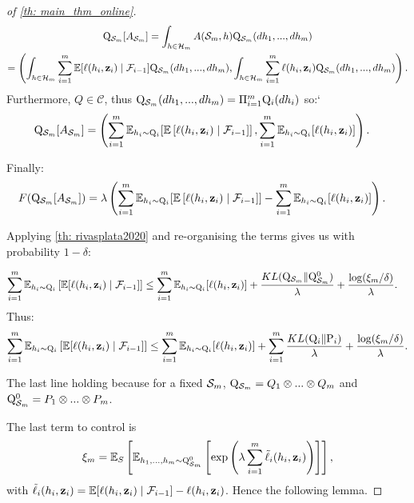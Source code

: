 \begin{proof}[of \cref{th: main_thm_online}]
\begin{multline*}
  \mathrm{Q}_{\mathcal{S}_m}[A_{\mathcal{S}_m}]  = \int_{h\in\mathcal{H}_m} A(\mathcal{S}_m,h) \mathrm{Q}_{\mathcal{S}_m}(dh_1,...,dh_m) \\
     = \left( \int_{h\in\mathcal{H}_m} \sum_{i=1}^m \mathbb{E}[\ell(h_i,\mathbf{z}_i)\mid \mathcal{F}_{i-1}]\mathrm{Q}_{\mathcal{S}_m}(dh_1,...,dh_m), \int_{h\in\mathcal{H}_m}\sum_{i=1}^m \ell(h_i,\mathbf{z}_i)  \mathrm{Q}_{\mathcal{S}_m}(dh_1,...,dh_m)    \right).
\end{multline*}
Furthermore, $Q\in\mathcal{C}$, thus $\mathrm{Q}_{\mathcal{S}_m}(dh_1,...,dh_m)= \Pi_{i=1}^m \mathrm{Q}_{i}(dh_i)$ so:`
\begin{align*}
  \mathrm{Q}_{\mathcal{S}_m}[A_{\mathcal{S}_m}] &= \left(  \sum_{i=1}^m \mathbb{E}_{h_i\sim \mathrm{Q}_{i}}[\mathbb{E}\left[\ell(h_i,\mathbf{z}_i)\mid \mathcal{F}_{i-1}]\right], \sum_{i=1}^m \mathbb{E}_{h_i\sim \mathrm{Q}_{i}}[\ell(h_i,\mathbf{z}_i)]       \right).
\end{align*}

Finally:
\begin{align*}
      F(\mathrm{Q}_{\mathcal{S}_m}[A_{\mathcal{S}_m}])&= \lambda \left(\sum_{i=1}^m \mathbb{E}_{h_i\sim \mathrm{Q}_{i}}[\mathbb{E}\left[\ell(h_i,\mathbf{z}_i)\mid \mathcal{F}_{i-1}]\right]- \sum_{i=1}^m \mathbb{E}_{h_i\sim \mathrm{Q}_{i}}[\ell(h_i,\mathbf{z}_i)] \right).
\end{align*}


Applying \cref{th: rivasplata2020} and re-organising the terms gives us with probability $1-\delta$:

\begin{align*}
\sum_{i=1}^m \mathbb{E}_{h_i\sim \mathrm{Q}_{i}}\left[\mathbb{E}[\ell(h_i,\mathbf{z}_i)\mid \mathcal{F}_{i-1}]\right] & \leq \sum_{i=1}^m \mathbb{E}_{h_i\sim \mathrm{Q}_{i}}[\ell(h_i,\mathbf{z}_i)] + \frac{KL(\mathrm{Q}_{\mathcal{S}_m}\|\mathrm{Q}_{\mathcal{S}_m}^0)}{\lambda} + \frac{\log(\xi_m/\delta)}{\lambda}.
\end{align*}
\noindent Thus:
\begin{align}
  \label{eq: temp_result_online_thm}
 \sum_{i=1}^m \mathbb{E}_{h_i\sim \mathrm{Q}_{i}}\left[\mathbb{E}[\ell(h_i,\mathbf{z}_i)\mid \mathcal{F}_{i-1}]\right] \leq \sum_{i=1}^m \mathbb{E}_{h_i\sim \mathrm{Q}_{i}}[\ell(h_i,\mathbf{z}_i)] + \sum_{i=1}^m \frac{KL(\mathrm{Q}_{i}\|\mathrm{P}_{i})}{\lambda} + \frac{\log(\xi_m/\delta)}{\lambda}.
\end{align}

\noindent The last line holding because for a fixed $\mathcal{S}_m$, $\mathrm{Q}_{\mathcal{S}_m}= Q_1\otimes...\otimes Q_m$ and $\mathrm{Q}_{\mathcal{S}_m}^0= P_1\otimes...\otimes P_m$.

\noindent The last term to control is
\begin{align*}
\xi_m = \mathbb{E}_S\left[\mathbb{E}_{h_1,...,h_m \sim \mathrm{Q}_{\mathcal{S}_m}^0} \left[\exp\left(\lambda \sum_{i=1}^m \Tilde{\ell}_i(h_i,\mathbf{z}_i)\right)\right]\right],
\end{align*}
with $\Tilde{\ell}_i(h_i,\mathbf{z}_i)= \mathbb{E}[\ell(h_i,\mathbf{z}_i)\mid \mathcal{F}_{i-1}]-  \ell(h_i,\mathbf{z}_i)$. Hence the following lemma.


\end{proof}
